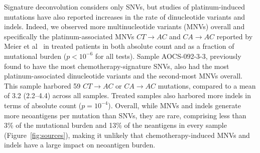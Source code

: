 Signature deconvolution considers only SNVs, but studies of platinum-induced mutations have also reported increases in the rate of dinucleotide variants and indels. Indeed, we observed more multinucleotide variants (MNVs) overall and specifically the platinum-associated MNVs $CT \rightarrow AC$ and $CA \rightarrow AC$ reported by Meier et al~\cite{Meier_2014} in treated patients in both absolute count and as a fraction of mutational burden ($p < 10^{-6}$ for all tests). Sample AOCS-092-3-3, previously found to have the most chemotherapy-signature SNVs, also had the most platinum-associated dinucleotide variants and the second-most MNVs overall. This sample harbored 59 $CT \rightarrow AC$ or $CA \rightarrow AC$ mutations, compared to a mean of 3.2 (2.2--4.4) across all samples. Treated samples also harbored more indels in terms of absolute count ($p=10^{-4}$). Overall, while MNVs and indels generate more neoantigens per mutation than SNVs, they are rare, comprising less than 3\% of the mutational burden and 13\% of the neantigens in every sample (Figure~\ref{fig:sources}), making it unlikely that chemotherapy-induced MNVs and indels have a large impact on neoantigen burden.





